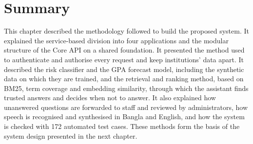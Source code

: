 \section{Summary}
This chapter described the methodology followed to build the proposed system. It explained the service-based division into four applications and the modular structure of the Core API on a shared foundation. It presented the method used to authenticate and authorise every request and keep institutions' data apart. It described the risk classifier and the GPA forecast model, including the synthetic data on which they are trained, and the retrieval and ranking method, based on BM25, term coverage and embedding similarity, through which the assistant finds trusted answers and decides when not to answer. It also explained how unanswered questions are forwarded to staff and reviewed by administrators, how speech is recognised and synthesised in Bangla and English, and how the system is checked with 172 automated test cases. These methods form the basis of the system design presented in the next chapter.
